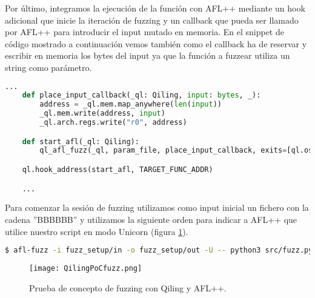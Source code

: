 Por último, integramos la ejecución de la función con AFL++ mediante un hook adicional que inicie la iteración de fuzzing y un callback que pueda ser 
llamado por AFL++ para introducir el input mutado en memoria. En el snippet de código mostrado a continuación vemos también como el callback ha de 
reservar y escribir en memoria los bytes del input ya que la función a fuzzear utiliza un string como parámetro.

\begin{lstlisting}[language=python, caption=Integración de AFL++ con nuestro script de Qiling., captionpos=b,
    frame=single, breaklines]
    ...
    def place_input_callback(_ql: Qiling, input: bytes, _):
        address = _ql.mem.map_anywhere(len(input))
        _ql.mem.write(address, input)
        _ql.arch.regs.write("r0", address)

    def start_afl(_ql: Qiling):
        ql_afl_fuzz(_ql, param_file, place_input_callback, exits=[ql.os.exit_point])

    ql.hook_address(start_afl, TARGET_FUNC_ADDR)

    ...
\end{lstlisting}

Para comenzar la sesión de fuzzing utilizamos como input inicial un fichero con la cadena ''BBBBBB'' y utilizamos la siguiente orden para 
indicar a AFL++ que utilice nuestro script en modo Unicorn (figura \ref{fig:QilingPoCfuzz}). 

\begin{lstlisting}[language=bash]
    $ afl-fuzz -i fuzz_setup/in -o fuzz_setup/out -U -- python3 src/fuzz.py @@
\end{lstlisting}

\begin{figure}[H]
    \centering
    \texttt{[image: QilingPoCfuzz.png]}
    \caption{Prueba de concepto de fuzzing con Qiling y AFL++.}
    \label{fig:QilingPoCfuzz}
\end{figure}

